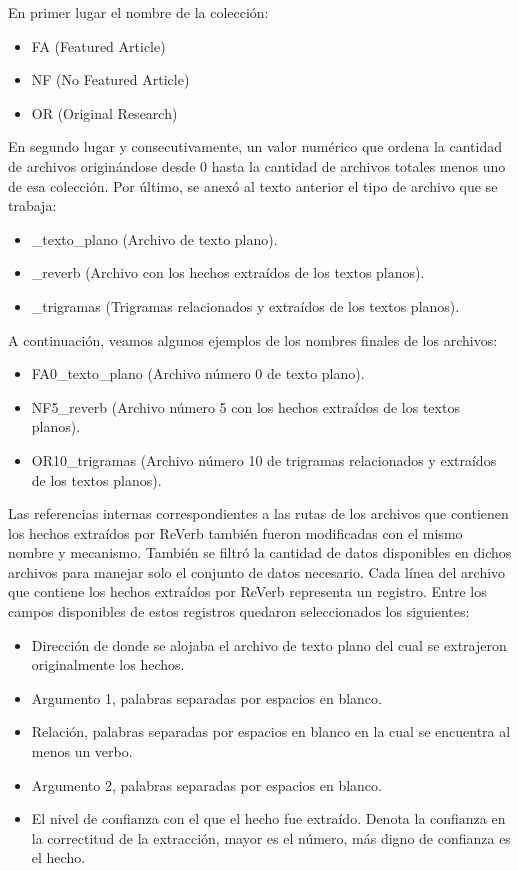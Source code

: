 En primer lugar el nombre de la colecci\'on:

\begin{itemize}
\item	FA (Featured Article)
\item	NF (No Featured Article)
\item	OR (Original Research)	
\end{itemize}

En segundo lugar y consecutivamente, un valor num\'erico que ordena la cantidad de archivos origin\'andose desde 0 hasta la cantidad de archivos totales menos uno de esa colecci\'on.
Por \'ultimo, se anex\'o al texto anterior el tipo de archivo que se trabaja:

\begin{itemize}
\item	\_texto\_plano (Archivo de texto plano).
\item	\_reverb (Archivo con los hechos extra\'idos de los textos planos).
\item	\_trigramas (Trigramas relacionados y extra\'idos de los textos planos).
\end{itemize}

A continuaci\'on, veamos algunos ejemplos de los nombres finales de los archivos:

\begin{itemize}
\item	FA0\_texto\_plano (Archivo n\'umero 0 de texto plano).
\item	NF5\_reverb (Archivo n\'umero 5 con los hechos extra\'idos de los textos planos).
\item	OR10\_trigramas (Archivo n\'umero 10 de trigramas relacionados y extra\'idos de los textos planos).
\end{itemize}

Las referencias internas correspondientes a las rutas de los archivos que contienen los hechos extra\'idos por ReVerb tambi\'en fueron modificadas con el mismo nombre y mecanismo.
Tambi\'en se filtr\'o la cantidad de datos disponibles en dichos archivos para manejar solo el conjunto de datos necesario. Cada l\'inea del archivo que contiene los hechos extra\'idos por ReVerb representa un registro. Entre los campos disponibles de estos registros quedaron seleccionados los siguientes:

\begin{itemize}
\item	Direcci\'on de donde se alojaba el archivo de texto plano del cual se extrajeron originalmente los hechos.
\item	Argumento 1, palabras separadas por espacios en blanco.
\item	Relaci\'on, palabras separadas por espacios en blanco en la cual se encuentra al menos un verbo.
\item	Argumento 2, palabras separadas por espacios en blanco.
\item	El nivel de confianza con el que el hecho fue extra\'ido. Denota la confianza en la correctitud de la extracci\'on, mayor es el n\'umero, m\'as digno de confianza es el hecho.
\end{itemize}

